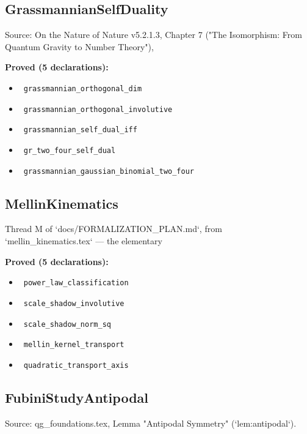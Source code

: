 \documentclass{report}
\theoremstyle{definition}
\begin{document}
\begin{itemize}
\begin{itemize}
\subsection{GrassmannianSelfDuality}
Source: On the Nature of Nature v5.2.1.3, Chapter 7 ("The Isomorphism: From Quantum Gravity to Number Theory"),

\noindent\textbf{Proved (5 declarations):}
\begin{itemize}
  \item {}\leanok\ \texttt{grassmannian\_orthogonal\_dim}
  \item {}\leanok\ \texttt{grassmannian\_orthogonal\_involutive}
  \item {}\leanok\ \texttt{grassmannian\_self\_dual\_iff}
  \item {}\leanok\ \texttt{gr\_two\_four\_self\_dual}
  \item {}\leanok\ \texttt{grassmannian\_gaussian\_binomial\_two\_four}
\end{itemize}

\subsection{MellinKinematics}
Thread M of `docs/FORMALIZATION\_PLAN.md`, from `mellin\_kinematics.tex` — the elementary

\noindent\textbf{Proved (5 declarations):}
\begin{itemize}
  \item {}\leanok\ \texttt{power\_law\_classification}
  \item {}\leanok\ \texttt{scale\_shadow\_involutive}
  \item {}\leanok\ \texttt{scale\_shadow\_norm\_sq}
  \item {}\leanok\ \texttt{mellin\_kernel\_transport}
  \item {}\leanok\ \texttt{quadratic\_transport\_axis}
\end{itemize}

\subsection{FubiniStudyAntipodal}
Source: qg\_foundations.tex, Lemma "Antipodal Symmetry" (`lem:antipodal`).


\end{itemize}
\end{itemize}
\end{document}
